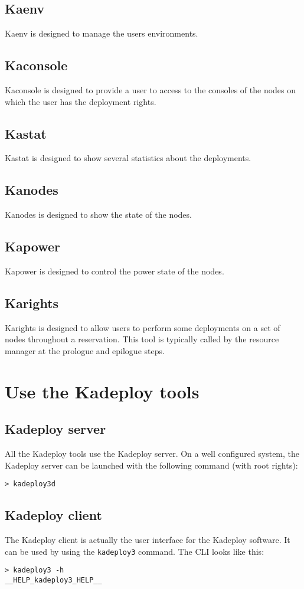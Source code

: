 \documentclass[a4wide,10pt,oneside]{book}
\begin{document}
\subsection{Kaenv}
Kaenv is designed to manage the users environments.

\subsection{Kaconsole}
Kaconsole is designed to provide a user to access to the consoles of the nodes on which the user has the deployment rights.

\subsection{Kastat}
Kastat is designed to show several statistics about the deployments.

\subsection{Kanodes}
Kanodes is designed to show the state of the nodes.

\subsection{Kapower}
Kapower is designed to control the power state of the nodes.

\subsection{Karights}
Karights is designed to allow users to perform some deployments on a set of nodes throughout a reservation. This tool is typically called by the resource manager at the prologue and epilogue steps.

\section{Use the Kadeploy tools}
\subsection{Kadeploy server}
All the Kadeploy tools use the Kadeploy server. On a well configured system, the Kadeploy server can be launched with the following command (with root rights):
\begin{verbatim}
> kadeploy3d
\end{verbatim}

\subsection{Kadeploy client}\label{sec:kadeploy_client}
The Kadeploy client is actually the user interface for the Kadeploy software. It can be used by using the \texttt{kadeploy3} command. The CLI looks like this:
\begin{small}
\begin{verbatim}
> kadeploy3 -h
__HELP_kadeploy3_HELP__
\end{verbatim}
\end{small}
\end{document}
